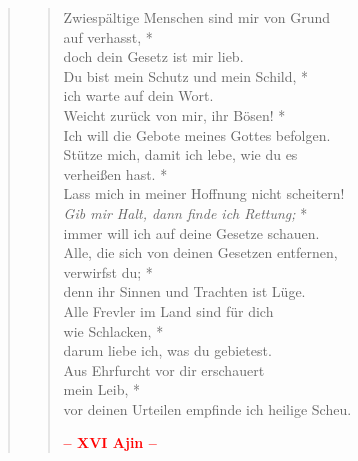 \begin{quote}
\begin{verse}
  Zwiespältige Menschen sind mir von Grund \\ auf verhasst, *\\
doch dein Gesetz ist mir lieb.\\ \vin 
  Du bist mein Schutz und mein Schild, *\\ \vin
ich warte auf dein Wort.\\
  Weicht zurück von mir, ihr Bösen! *\\
Ich will die Gebote meines Gottes befolgen.\\ \vin 
  Stütze mich, damit ich lebe, wie du es\\ \vin  verheißen hast. *\\ \vin
Lass mich in meiner Hoffnung nicht scheitern!\\
  \textit{Gib mir Halt, dann finde ich Rettung;} *\\
immer will ich auf deine Gesetze schauen.\\ \vin
  Alle, die sich von deinen Gesetzen entfernen, \\ \vin verwirfst du; *\\ \vin
denn ihr Sinnen und Trachten ist Lüge.\\
  Alle Frevler im Land sind für dich\\ wie Schlacken, *\\
darum liebe ich, was du gebietest.\\ \vin 
 Aus Ehrfurcht vor dir erschauert\\ \vin  mein Leib, *\\ \vin
vor deinen Urteilen empfinde ich heilige Scheu.\\              

\begin{center}
 \textcolor{red}{\normalsize\bf – XVI Ajin –}\\
\end{center} 



\end{verse}
\end{quote}
